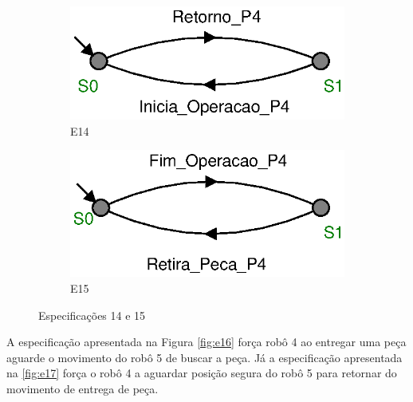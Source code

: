 \begin{figure}[H]%
  \centering
  \begin{subfigure}{0.45\textwidth}
      \centering
      \includegraphics[width=\textwidth]{imagens/E14.eps}
      \caption{E14}
      \label{fig:e14}
  \end{subfigure}
  \hfill
  \begin{subfigure}{0.45\textwidth}
      \centering
      \includegraphics[width=\textwidth]{imagens/E15.eps}
      \caption{E15}
      \label{fig:e15}
  \end{subfigure}
  \caption{Especificações 14 e 15}
  \label{fig:e1415}
\end{figure}

A especificação apresentada na Figura \ref{fig:e16} força robô 4 ao entregar uma peça aguarde o movimento do robô 5 de buscar a peça.
Já a especificação apresentada na \ref{fig:e17} força o robô 4 a aguardar posição segura do robô 5 para retornar do movimento de entrega de peça.

